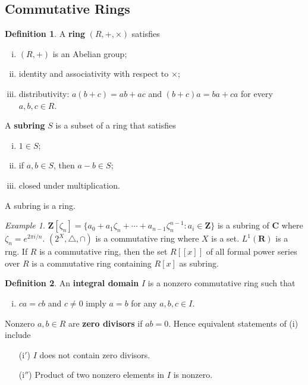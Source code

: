 \documentclass[11pt]{article}
\theoremstyle{definition}
\newtheorem*{defin}{Definition}
\theoremstyle{plain}
\theoremstyle{remark}
\newtheorem*{example}{Example}
\newcommand{\R}{\mathbf{R}}
\newcommand{\Z}{\mathbf{Z}}
\newcommand{\C}{\mathbf{C}}
\begin{document}
\subsection*{Commutative Rings}

\begin{defin}
A \textbf{ring} $(R,+,\times)$ satisfies\begin{enumerate}[(i)]
    \item $(R,+)$ is an Abelian group;
    \item identity and associativity with respect to $\times$;
    \item distributivity: $a(b+c)=ab+ac$ and $(b+c)a=ba+ca$ for every $a,b,c\in R$.
\end{enumerate}
A \textbf{subring} $S$ is a subset of a ring that satisfies\begin{enumerate}[(i)]
    \item $1\in S$;
    \item if $a,b\in S$, then $a-b\in S$;
    \item closed under multiplication.
\end{enumerate}
A subring is a ring.
\end{defin}

\begin{example}
$\Z[\zeta_n]=\{a_0+a_1\zeta_n+\cdots+a_{n-1}\zeta_n^{n-1}:a_i\in\Z\}$ is a subring of $\C$ where $\zeta_n=e^{2\pi i/n}$. $(2^X,\bigtriangleup,\cap)$ is a commutative ring where $X$ is a set. $L^1(\R)$ is a rng. If $R$ is a commutative ring, then the set $R[[x]]$ of all formal power series over $R$ is a commutative ring containing $R[x]$ as subring.
\end{example}

\begin{defin}
An \textbf{integral domain} $I$ is a nonzero commutative ring such that\begin{enumerate}[(i)]
    \item $ca=cb$ and $c\neq0$ imply $a=b$ for any $a,b,c\in I$.
\end{enumerate}
Nonzero $a,b\in R$ are \textbf{zero divisors} if $ab=0$. Hence equivalent statements of (i) include\begin{enumerate}
    \item [(i$'$)] $I$ does not contain zero divisors.
    \item [(i$''$)] Product of two nonzero elements in $I$ is nonzero.
\end{enumerate}
\end{defin}
\end{document}
